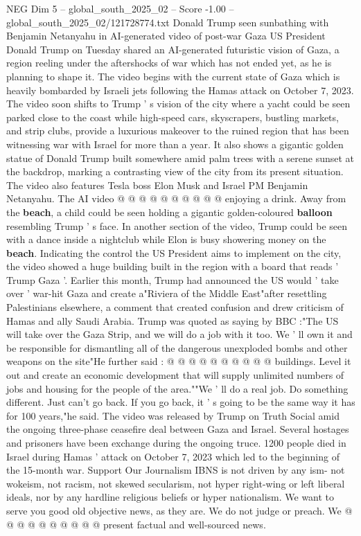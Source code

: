 \begin{textsample}{NEG Dim 5 – global\_south\_2025\_02 – Score -1.00 – global\_south\_2025\_02/121728774.txt}  \label{ex:f5_neg_244}
Donald Trump seen sunbathing with Benjamin Netanyahu in AI-generated video of post-war Gaza US President Donald Trump on Tuesday shared an AI-generated futuristic vision of Gaza, a region reeling under the aftershocks of war which has not ended yet, as he is planning to shape it.
The video begins with the current state of Gaza which is heavily bombarded by Israeli jets following the Hamas attack on October 7, 2023.
The video soon shifts to Trump ' s vision of the city where a yacht could be seen parked close to the coast while high-speed cars, skyscrapers, bustling markets, and strip clubs, provide a luxurious makeover to the ruined region that has been witnessing war with Israel for more than a year.
It also shows a gigantic golden statue of Donald Trump built somewhere amid palm trees with a serene sunset at the backdrop, marking a contrasting view of the city from its present situation.
The video also features Tesla boss Elon Musk and Israel PM Benjamin Netanyahu.
The AI video @ @ @ @ @ @ @ @ @ @ enjoying a drink.
Away from the \textbf{beach}, a child could be seen holding a gigantic golden-coloured \textbf{balloon} resembling Trump ' s face.
In another section of the video, Trump could be seen with a dance inside a nightclub while Elon is busy showering money on the \textbf{beach}.
Indicating the control the US President aims to implement on the city, the video showed a huge building built in the region with a board that reads ' Trump Gaza '.
Earlier this month, Trump had announced the US would ' take over ' war-hit Gaza and create a"Riviera of the Middle East"after resettling Palestinians elsewhere, a comment that created confusion and drew criticism of Hamas and ally Saudi Arabia.
Trump was quoted as saying by BBC :"The US will take over the Gaza Strip, and we will do a job with it too.
We ' ll own it and be responsible for dismantling all of the dangerous unexploded bombs and other weapons on the site"He further said : @ @ @ @ @ @ @ @ @ @ buildings.
Level it out and create an economic development that will supply unlimited numbers of jobs and housing for the people of the area.""We ' ll do a real job.
Do something different.
Just can't go back.
If you go back, it ' s going to be the same way it has for 100 years,"he said.
The video was released by Trump on Truth Social amid the ongoing three-phase ceasefire deal between Gaza and Israel.
Several hostages and prisoners have been exchange during the ongoing truce. 1200 people died in Israel during Hamas ' attack on October 7, 2023 which led to the beginning of the 15-month war.
Support Our Journalism IBNS is not driven by any ism- not wokeism, not racism, not skewed secularism, not hyper right-wing or left liberal ideals, nor by any hardline religious beliefs or hyper nationalism.
We want to serve you good old objective news, as they are.
We do not judge or preach.
We @ @ @ @ @ @ @ @ @ @ present factual and well-sourced news.

\end{textsample}
